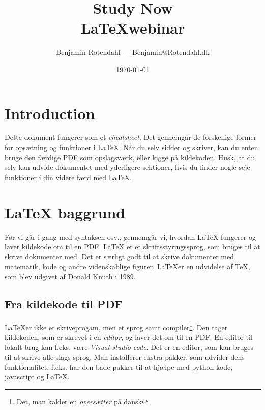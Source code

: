 \documentclass{article}
\title{
  \vspace{13em}
  \large{Study Now} \\
  \Large{\LaTeX webinar} \\
}
\author{
  Benjamin Rotendahl --- Benjamin@Rotendahl.dk
}
\date{
  \vspace{22em}
  \today
}
\begin{document}
\clearpage

\maketitle		%
\thispagestyle{empty}
\newpage

\thispagestyle{empty}\tableofcontents\newpage %

\setcounter{page}{1}

\section{Introduction}
 Dette dokument fungerer som et \emph{cheatsheet}. Det gennemgår de forskellige
 former for opsætning og funktioner i \LaTeX. Når du selv sidder og skriver, kan
 du enten bruge den færdige PDF som opslagsværk, eller kigge på kildekoden.
 Husk, at du selv kan udvide dokumentet med yderligere sektioner, hvis du finder
 nogle seje funktioner i din videre færd med \LaTeX{}.

\section{\LaTeX{} baggrund}
 Før vi går i gang med syntaksen osv., gennemgår vi, hvordan \LaTeX{} fungerer og
 laver kildekode om til en PDF.
 \LaTeX{} er et skriftsstyringssprog, som bruges til at skrive dokumenter med. Det er
 særligt godt til at skrive dokumenter med matematik, kode og andre
 videnskablige figurer. \LaTeX er en udvidelse af TeX, som blev udgivet af Donald
 Knuth i 1989.

 \subsection{Fra kildekode til PDF}\label{sec:local}
   \LaTeX er ikke et skriveprogam, men et sprog samt compiler\footnote{
     Det, man kalder en \emph{oversætter} på dansk}. Den tager kildekoden, som er skrevet i en
   \emph{editor}, og laver det om til en PDF. En editor til lokalt brug kan
   f.eks. være \emph{Visual studio code}\cite{vscode}. Det er en editor, som kan
   bruges til at skrive alle slags sprog. Man installerer ekstra pakker, som
   udvider dens funktionalitet, f.eks. har den både pakker til at hjælpe med
   python-kode, javascript og \LaTeX{}\cite{latexPackage}.
\end{document}
